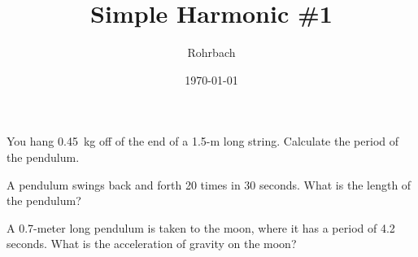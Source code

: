 \documentclass[10pt]{exam}
\title{Simple Harmonic \#1}
\author{Rohrbach}
\date{\today}
\begin{document}
\maketitle

\begin{questions}

\question
  You hang 0.45~kg off of the end of a 1.5-m long string.  Calculate the period of the pendulum.

\vs 

\question
  A pendulum swings back and forth 20 times in 30 seconds.  What is the length of the pendulum? 


\vs 


\question
  A 0.7-meter long pendulum is taken to the moon, where it has a period of 4.2 seconds.  What is the acceleration of gravity on the moon?
  \vs 

\pagebreak






  

  
  







\end{questions}
\end{document}
